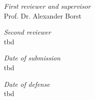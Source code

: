 \hfill

\vfill

\textit{First reviewer and supervisor} \\
Prof. Dr. Alexander Borst

\bigskip

\textit{Second reviewer} \\
tbd

\bigskip

\textit{Date of submission} \\
tbd

\bigskip

\textit{Date of defense} \\
tbd